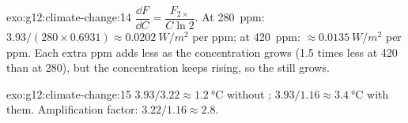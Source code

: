 \begin{solution}{exo:g12:climate-change:14}
$\dfrac{\dd F}{\dd C} = \dfrac{F_{2\times}}{C \ln 2}$. At \qty{280}{ppm}:
$3.93/(280 \times 0.6931) \approx \qty{0.0202}{W/m^2}$ per ppm; at
\qty{420}{ppm}: $\approx \qty{0.0135}{W/m^2}$ per ppm. Each extra ppm adds
less  as the concentration grows (1.5 times less at 420 than at 280),
but the concentration keeps rising, so the  still grows.
\end{solution}

\begin{solution}{exo:g12:climate-change:15}
$3.93/3.22 \approx \qty{1.2}{\degreeCelsius}$ without ;
$3.93/1.16 \approx \qty{3.4}{\degreeCelsius}$ with them. Amplification
factor: $3.22/1.16 \approx 2.8$.
\end{solution}


